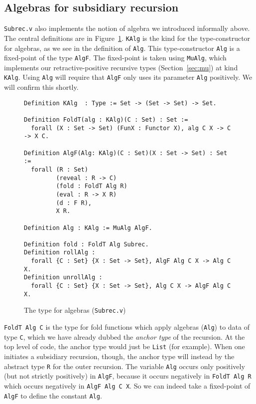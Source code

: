 \documentclass[a4paper,USenglish]{lipics-v2021}
\begin{document}
\subsection{Algebras for subsidiary recursion}

\verb|Subrec.v| also implements the notion of algebra we introduced informally above.  The central definitions are in
Figure~\ref{fig:algf}.  \verb|KAlg| is the kind for the
type-constructor for algebras, as we see in the definition of
\verb|Alg|.  This type-constructor \verb|Alg| is a fixed-point of the
type \verb|AlgF|.  The fixed-point is taken using \verb|MuAlg|, which
implements our retractive-positive recursive types
(Section~\ref{sec:mu}) at kind \verb|KAlg|.  Using \verb|Alg| will
require that \verb|AlgF| only uses its parameter \verb|Alg|
positively.  We will confirm this shortly.

\begin{figure}
\begin{verbatim}
Definition KAlg  : Type := Set -> (Set -> Set) -> Set.

Definition FoldT(alg : KAlg)(C : Set) : Set :=
  forall (X : Set -> Set) (FunX : Functor X), alg C X -> C -> X C.

Definition AlgF(Alg: KAlg)(C : Set)(X : Set -> Set) : Set :=
  forall (R : Set)
         (reveal : R -> C)        
         (fold : FoldT Alg R)
         (eval : R -> X R)      
         (d : F R),             
         X R.

Definition Alg : KAlg := MuAlg AlgF.

Definition fold : FoldT Alg Subrec.
Definition rollAlg :
  forall {C : Set} {X : Set -> Set}, AlgF Alg C X -> Alg C X.
Definition unrollAlg : 
  forall {C : Set} {X : Set -> Set}, Alg C X -> AlgF Alg C X.
\end{verbatim}
\caption{The type for algebras (\texttt{Subrec.v})}
\label{fig:algf}
\end{figure}

\verb|FoldT Alg C| is the type for fold functions which apply
algebras (\verb|Alg|) to data of type \verb|C|, which we have already
dubbed the \emph{anchor type} of the recursion.  At the top level of
code, the anchor type would just be \verb|List| (for example).  When
one initiates a subsidiary recursion, though, the anchor type will
instead by the abstract type \verb|R| for the outer recursion.  The
variable \verb|Alg| occurs only positively (but not strictly
positively) in \verb|AlgF|, because it occurs negatively in
\verb|FoldT Alg R| which occurs negatively in \verb|AlgF Alg C X|.  So
we can indeed take a fixed-point of \verb|AlgF| to define the constant
\verb|Alg|.
\end{document}
